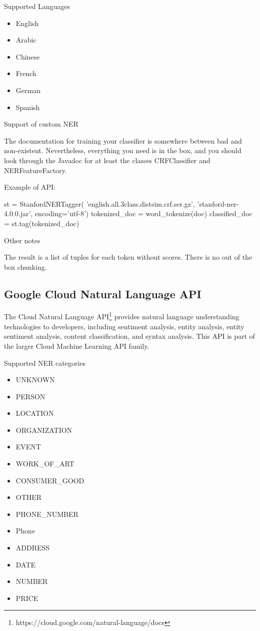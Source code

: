 \documentclass[conference]{IEEEtran}
\begin{document}
Supported Languages

\begin{itemize}
	\item English
	\item Arabic
	\item Chinese
	\item French
	\item German
	\item Spanish
\end{itemize}

Support of custom NER

The documentation for training your classifier is somewhere between bad and non-existent. Nevertheless, everything you need is in the box, and you should look through the Javadoc for at least the classes CRFClassifier and NERFeatureFactory.

Example of API:

\begin{verbatimtab}[4]
st = StanfordNERTagger(
		'english.all.3class.distsim.crf.ser.gz', 
		'stanford-ner-4.0.0.jar',
		encoding='utf-8')
tokenized_doc = word_tokenize(doc)
classified_doc = st.tag(tokenized_doc)
\end{verbatimtab}

Other notes

The result is a list of tuples for each token without scores. There is no out of the box chunking.

\subsection{Google Cloud Natural Language API}

The Cloud Natural Language API\footnote{https://cloud.google.com/natural-language/docs}  provides natural language understanding technologies to developers, including sentiment analysis, entity analysis, entity sentiment analysis, content classification, and syntax analysis. This API is part of the larger Cloud Machine Learning API family.

Supported NER categories

\begin{itemize}
	\item UNKNOWN
	\item PERSON
	\item LOCATION
	\item ORGANIZATION
	\item EVENT
	\item WORK\_OF\_ART
	\item CONSUMER\_GOOD
	\item OTHER
	\item PHONE\_NUMBER
	\item Phone
	\item ADDRESS
	\item DATE
	\item NUMBER
	\item PRICE
\end{itemize}
\end{document}
